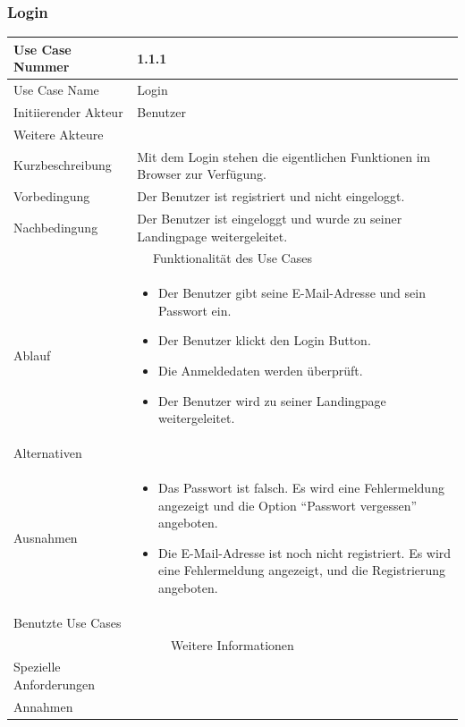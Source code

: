 \documentclass[10pt,a4paper]{article}
\begin{document}
\subsubsection{Login}
	\begin{tabular}{|l|p{.5\linewidth}|}
	\hline Use Case Nummer & 1.1.1 \\ 
	\hline Use Case Name & Login \\ 
	\hline Initiierender Akteur & Benutzer \\
	\hline Weitere Akteure & \\
	\hline Kurzbeschreibung & Mit dem Login stehen die eigentlichen Funktionen im Browser zur Verf\"ugung. \\
	\hline Vorbedingung & Der Benutzer ist registriert und nicht eingeloggt. \\
	\hline Nachbedingung & Der Benutzer ist eingeloggt und wurde zu seiner Landingpage weitergeleitet. \\
	\hline \multicolumn{2}{|c|}{Funktionalität des Use Cases}\\
	\hline Ablauf & \begin{itemize}
		\item Der Benutzer gibt seine E-Mail-Adresse und sein Passwort ein.
		\item Der Benutzer klickt den Login Button.
                \item Die Anmeldedaten werden überprüft.
                \item Der Benutzer wird zu seiner Landingpage weitergeleitet.
	\end{itemize} \\
	\hline Alternativen &  \\
	\hline Ausnahmen & \begin{itemize}
		\item Das Passwort ist falsch. Es wird eine Fehlermeldung angezeigt und die Option ``Passwort vergessen'' angeboten.
		\item Die E-Mail-Adresse ist noch nicht registriert. Es wird eine Fehlermeldung angezeigt, und die Registrierung angeboten.
	\end{itemize} \\
	\hline Benutzte Use Cases &  \\
	\hline \multicolumn{2}{|c|}{Weitere Informationen} \\
	\hline Spezielle Anforderungen &  \\
	\hline Annahmen &  \\
	\hline
	\end{tabular}
			 
\end{document}
